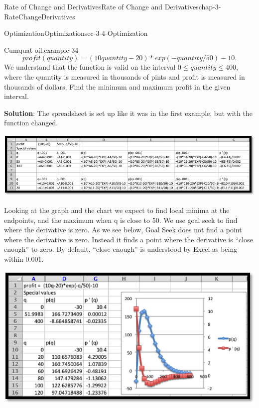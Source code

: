 \documentclass[oneside,10pt,]{book}
\newcommand{\terminology}[1]{\textbf{#1}}
\numberwithin{equation}{section}
\begin{document}
\begin{chapterptx}{Rate of Change and Derivatives}{}{Rate of Change and Derivatives}{}{}{chap-3-RateChangeDerivatives}
\begin{sectionptx}{Optimization}{}{Optimization}{}{}{sec-3-4-Optimization}
\begin{example}{Cumquat oil.}{example-34}
\begin{equation*}
profit(quantity)=(10quantity-20)*exp(-quantity/50)-10.
\end{equation*}
\hypertarget{p-1211}{}%
We understand that the function is valid on the interval \(0\le quantity\le 400\), where the quantity is measured in thousands of pints and profit is measured in thousands of dollars.  Find the minimum and maximum profit in the given interval.%
\par
\hypertarget{p-1212}{}%
\terminology{Solution}:  The spreadsheet is set up like it was in the first example, but with the function changed.%
\begin{sidebyside}{1}{0}{0}{0}%
\begin{sbspanel}{1}%
\includegraphics[width=1\linewidth]{images/sec3-4-3.png}
\end{sbspanel}%
\end{sidebyside}%
\par
\hypertarget{p-1213}{}%
Looking at the graph and the chart we expect to find local minima at the endpoints, and the maximum when q is close to 50.  We use goal seek to find where the derivative is zero.  As we see below, Goal Seek does not find a point where the derivative is zero.  Instead it finds a point where the derivative is ``close enough'' to zero.  By default, ``close enough'' is understood by Excel as being within 0.001.%
\begin{sidebyside}{1}{0.15}{0.15}{0}%
\begin{sbspanel}{0.7}%
\includegraphics[width=1\linewidth]{images/sec3-4-4.png}
\end{sbspanel}%

\end{sidebyside}
\end{example}
\end{sectionptx}
\end{chapterptx}
\end{document}
